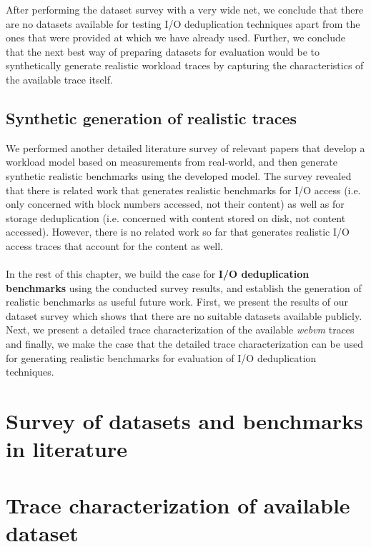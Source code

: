 After performing the dataset survey with a very wide net, we conclude that 
there are no datasets available for testing I/O deduplication techniques
apart from the ones that were provided at \cite{iodedup-online} which we
have already used. Further, we conclude that the next best way of
preparing datasets for evaluation would be to synthetically generate 
realistic workload traces by capturing the characteristics of the 
available trace itself. 

\subsection{Synthetic generation of realistic traces}
We performed another detailed
literature survey of relevant papers that develop a workload model
based on measurements from real-world, and then 
generate synthetic realistic benchmarks using
the developed model. The survey revealed that there is related work
that generates realistic benchmarks for I/O access (i.e. only concerned
with block numbers accessed, not their content) as well as for storage 
deduplication (i.e. concerned with content stored on disk, not content 
accessed). However, there is no related work so far that generates
realistic I/O access traces that account for the content as well. 
\\
\\
In the rest of this chapter, we build the case for 
\textbf{I/O deduplication benchmarks}
using the conducted survey results, and establish the generation of realistic
benchmarks as useful future work. First, we present the results of our
dataset survey which shows that there are no suitable datasets available
publicly. Next, we present a detailed trace characterization of the 
available \textit{webvm} traces~\cite{iodedup-online} and finally, we make the
case that the detailed trace characterization can be used for generating
realistic benchmarks for evaluation of I/O deduplication techniques.

\section{Survey of datasets and benchmarks in literature}
\label{sec:architectingchap-survey}


\section{Trace characterization of available dataset} %
\label{sec:architectingchap-tracechar}


